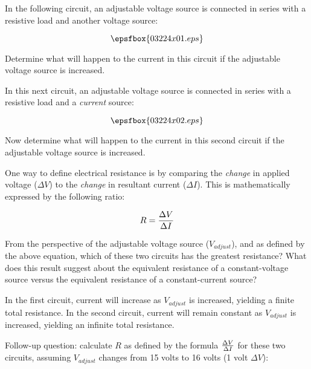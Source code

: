 

In the following circuit, an adjustable voltage source is connected in series with a resistive load and another voltage source:

$$\epsfbox{03224x01.eps}$$

Determine what will happen to the current in this circuit if the adjustable voltage source is increased.

\vskip 10pt

In this next circuit, an adjustable voltage source is connected in series with a resistive load and a {\it current} source:

$$\epsfbox{03224x02.eps}$$

Now determine what will happen to the current in this second circuit if the adjustable voltage source is increased.

\vskip 10pt

One way to define electrical resistance is by comparing the {\it change} in applied voltage ($\Delta V$) to the {\it change} in resultant current ($\Delta I$).  This is mathematically expressed by the following ratio:

$$R = {\Delta V \over \Delta I}$$

From the perspective of the adjustable voltage source ($V_{adjust}$), and as defined by the above equation, which of these two circuits has the greatest resistance?  What does this result suggest about the equivalent resistance of a constant-voltage source versus the equivalent resistance of a constant-current source?







In the first circuit, current will increase as $V_{adjust}$ is increased, yielding a finite total resistance.  In the second circuit, current will remain constant as $V_{adjust}$ is increased, yielding an infinite total resistance.

\vskip 10pt

Follow-up question: calculate $R$ as defined by the formula ${\Delta V \over \Delta I}$ for these two circuits, assuming $V_{adjust}$ changes from 15 volts to 16 volts (1 volt $\Delta V$):

